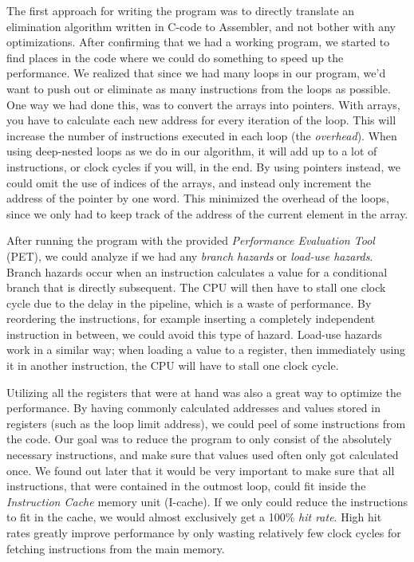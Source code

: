 \documentclass[a4paper,9pt,fleqn]{article}
\begin{document}
The first approach for writing the program was to directly translate an elimination algorithm written
in C-code to Assembler, and not bother with any optimizations. After confirming that we had a working
program, we started to find places in the code where we could do something to speed up the 
performance. We realized that since we had many loops in our program, we'd want to push out or 
eliminate as many instructions from the loops as possible. One way we had done this, was to convert the 
arrays into pointers. With arrays, you have to calculate each new address for every iteration of the 
loop. This will increase the number of instructions executed in each loop (the {\it overhead}). When using
deep-nested loops as we do in our algorithm, it will add up to a lot of instructions, or clock cycles if
you will, in the end. By using pointers instead, we could omit the use of indices of the arrays, and instead
only increment the address of the pointer by one word. This minimized the overhead of the loops, since we only
had to keep track of the address of the current element in the array.

After running the program with the provided {\it Performance Evaluation Tool} (PET), we could analyze if
we had any {\it branch hazards} or {\it load-use hazards}. Branch hazards occur when an instruction
calculates a value for a conditional branch that is directly subsequent. The CPU will then have to stall
one clock cycle due to the delay in the pipeline, which is a waste of performance. By reordering the
instructions, for example inserting a completely independent instruction in between, we could avoid
this type of hazard. Load-use hazards work in a similar way; when loading a value to a register,
then immediately using it in another instruction, the CPU will have to stall one clock cycle.

Utilizing all the registers that were at hand was also a great way to optimize the performance. By having
commonly calculated addresses and values stored in registers (such as the loop limit address), we could
peel of some instructions from the code. Our goal was to reduce the program to only consist of the 
absolutely necessary instructions, and make sure that values used often only got calculated once. We 
found out later that it would be very important to make sure that  all instructions, that were contained in the 
outmost loop, could fit inside the {\it Instruction Cache} memory unit (I-cache). If we only could reduce 
the instructions to fit in the cache, we would almost exclusively get a 100\% {\it hit rate}. High hit rates
greatly improve performance by only wasting relatively few clock cycles for fetching instructions from the
main memory.
\end{document}
